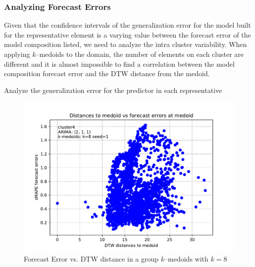 \subsubsection{Analyzing Forecast Errors}

Given that the confidence intervals of the generalization error for the model built for the representative element is a varying value between the forecast error of the model composition listed, we need to analyze the intra cluster variability. When applying $k$--medoids to the domain, the number of elements on each cluster are different and it is almost impossible to find a correlation between the model composition forecast error and the DTW distance from the medoid.


Analyze the generalization error for the predictor in each representative 

\begin{figure}[h]
	\centering
	\includegraphics[scale=0.5]{../Figures/auto_arima_distance_error_whole_brazil_1y_1ppd_k8_seed1_cluster4_pdq2-1-1_sMAPE}
	\caption{Forecast Error vs. DTW distance in a group $k$--medoids with $k=8$}
	\label{Fig:DTWvsForecastError}
\end{figure}

